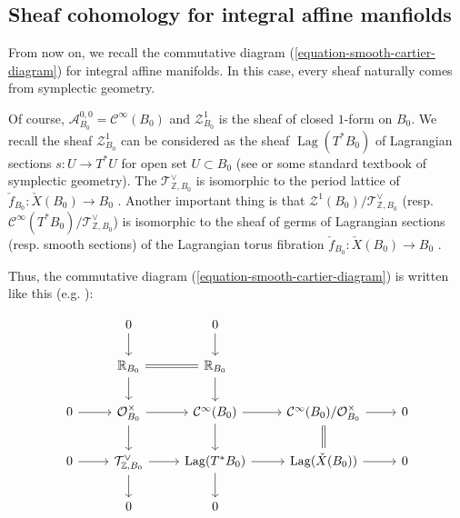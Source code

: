 \documentclass[a4paper,dvipdfmx,reqno,12pt]{amsart}
\theoremstyle{definition}
\newcommand{\Z}{\mathbb{Z}}%
\newcommand{\mb}[1]{\mathbb{#1}}%
\newcommand{\mcal}[1]{\mathcal{#1}}%
\newcommand{\opn}[1]{\operatorname{#1}}
\numberwithin{equation}{section}
\begin{document}
\subsection{Sheaf cohomology for integral affine manfiolds}

From now on, we recall the commutative diagram (\ref{equation-smooth-cartier-diagram})
 for integral affine manifolds.
In this case, every sheaf naturally comes 
from symplectic geometry.

Of course, 
$\mcal{A}_{B_0}^{0,0}=\mcal{C}^{\infty}(B_0)$ and
$\mcal{Z}^{1}_{B_0}$ is the sheaf of 
closed $1$-form on $B_0$.
We recall the sheaf $\mcal{Z}^{1}_{B_0}$ can be 
considered as the sheaf 
$\opn{Lag}(T^{*}B_0)$ of Lagrangian sections 
$s:U \to T^{*}U$ for open set $U \subset B_0$ 
(see \cite[3.2]{MR1853077} or some standard textbook
of symplectic geometry).
The $\mcal{T}_{\Z,B_0}^{\vee}$ is isomorphic to
the period lattice of 
$\check{f}_{B_0}\colon \check{X}(B_0)\to B_0$ 
 \cite{duistermaatGlobalActionangleCoordinates1980a}.
Another important thing is that 
$\mcal{Z}^{1}(B_0)/\mcal{T}_{\Z,B_0}^{\vee}$
 (resp. $\mcal{C}^{\infty}(T^{*}B_0)/\mcal{T}_{\Z,B_0}^{\vee}$) 
is isomorphic to the sheaf of germs of Lagrangian sections 
(resp. smooth sections) of the Lagrangian torus fibration 
$\check{f}_{B_0}\colon \check{X}(B_0)\to B_0$ 
\cite[(2.7), (2.11)]{duistermaatGlobalActionangleCoordinates1980a}.


Thus, the commutative diagram (\ref{equation-smooth-cartier-diagram}) is written like this 
(e.g. \cite[p.468]{MR2567952}):

\begin{equation} \label{equation-cartier-lagrangian}
  \begin{tikzcd}
    & 0 \arrow[d]    & 0 \arrow[d]           &                      &   \\
    & \mb{R}_{B_0} \arrow[r,equal] \arrow[d]                & \mb{R}_{B_0} \arrow[d]           &                      &   \\
    0 \arrow[r] & \mathcal{O}_{B_0}^{\times} \arrow[r] \arrow[d]         & \mcal{C}^{\infty}(B_0) \arrow[r] \arrow[d] & \mcal{C}^{\infty}(B_0)/\mathcal{O}_{B_0}^{\times}  \arrow[r] \arrow[d,equal] & 0 \\
    0 \arrow[r] & \mcal{T}_{\Z,B_0}^{\vee} \arrow[r] \arrow[d] & \opn{Lag}(T^{*}B_0) \arrow[r] \arrow[d]  & \opn{Lag}(\check{X}(B_0)) \arrow[r]   & 0 \\
    & 0 & 0 &  &
  \end{tikzcd}
\end{equation}
\end{document}
